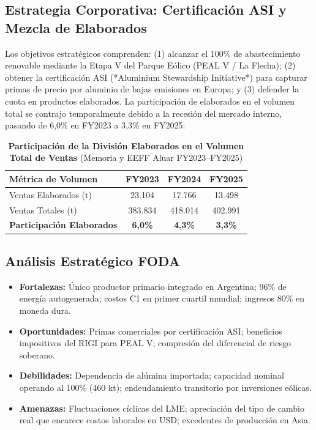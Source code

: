 \documentclass[10pt,a4paper]{article}
\begin{document}
\subsection{Estrategia Corporativa: Certificación ASI y Mezcla de Elaborados}
Los objetivos estratégicos comprenden: (1) alcanzar el 100\% de abastecimiento renovable mediante la Etapa V del Parque Eólico (PEAL V / La Flecha); (2) obtener la certificación ASI (*Aluminium Stewardship Initiative*) para capturar primas de precio por aluminio de bajas emisiones en Europa; y (3) defender la cuota en productos elaborados. La participación de elaborados en el volumen total se contrajo temporalmente debido a la recesión del mercado interno, pasando de 6,0\% en FY2023 a 3,3\% en FY2025:

\begin{table}[H]
\centering
\caption{\textbf{Participación de la División Elaborados en el Volumen Total de Ventas} {\small\color{gsgray} (Memoria y EEFF Aluar FY2023–FY2025)}}
\small
\begin{tabular}{lccc}
\toprule
\textbf{Métrica de Volumen} & \textbf{FY2023} & \textbf{FY2024} & \textbf{FY2025} \\
\midrule
Ventas Elaborados (t) & 23.104 & 17.766 & 13.498 \\
Ventas Totales (t) & 383.834 & 418.014 & 402.991 \\
\textbf{Participación Elaborados} & \textbf{6,0\%} & \textbf{4,3\%} & \textbf{3,3\%} \\
\bottomrule
\end{tabular}
\end{table}

\subsection{Análisis Estratégico FODA}
\begin{itemize}
    \item \textbf{Fortalezas:} Único productor primario integrado en Argentina; 96\% de energía autogenerada; costos C1 en primer cuartil mundial; ingresos 80\% en moneda dura.
    \item \textbf{Oportunidades:} Primas comerciales por certificación ASI; beneficios impositivos del RIGI para PEAL V; compresión del diferencial de riesgo soberano.
    \item \textbf{Debilidades:} Dependencia de alúmina importada; capacidad nominal operando al 100\% (460 kt); endeudamiento transitorio por inversiones eólicas.
    \item \textbf{Amenazas:} Fluctuaciones cíclicas del LME; apreciación del tipo de cambio real que encarece costos laborales en USD; excedentes de producción en Asia.
\end{itemize}
\end{document}

